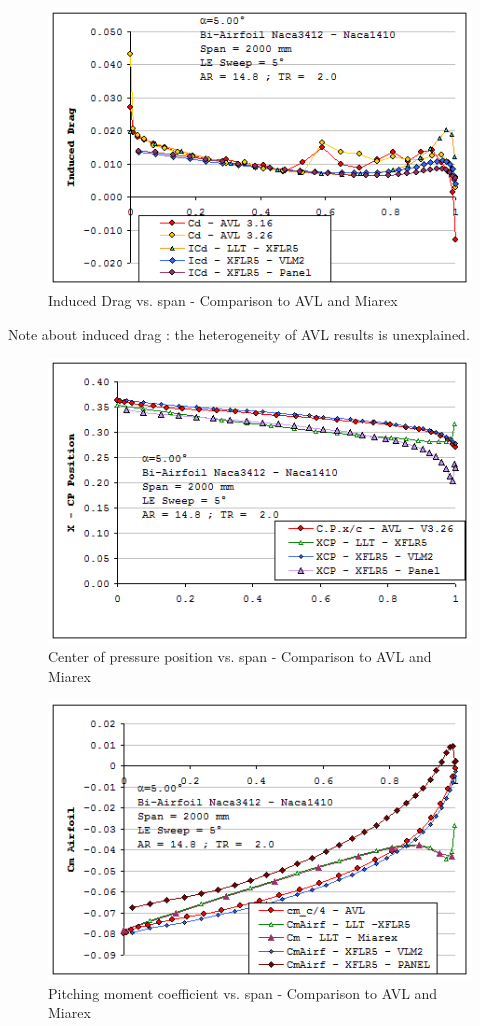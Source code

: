 \documentclass[a4paper,twoside,12pt,dvips]{article}
\begin{document}
\begin{figure}[htbp]
  \includegraphics[width=0.8\linewidth]{img-43}\centering 
  \caption{Induced Drag vs. span - Comparison to AVL and Miarex}
  \label{fig:induced_drag_vs_span_comparison_to_avl_and_miarex}
\end{figure}

Note about induced drag : the heterogeneity of AVL results is
unexplained.

\begin{figure}[htbp]
  \includegraphics[width=0.8\linewidth]{img-44}\centering 
  \caption{Center of pressure position vs. span - Comparison to AVL and Miarex}
  \label{fig:center_of_pressure_position_vs_span_comparison_to_avl_and_miarex}
\end{figure}

\begin{figure}[htbp]
  \includegraphics[width=0.8\linewidth]{img-45}\centering 
  \caption{Pitching moment coefficient vs. span - Comparison to AVL and Miarex}
  \label{fig:pitching_moment_coefficient_vs_span_comparison_to_avl_and_miarex}
\end{figure}
\end{document}
